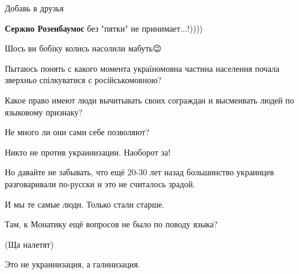 \begin{itemize}
 
Добавь в друзья

 
\textbf{Сержио Розенбаумос} без "пятки" не принимает...!))))

 
Шось ви бобіку колись насолили мабуть😉🤘🤘🤘


Пытаюсь понять с какого момента україномовна частина населення почала зверхньо
спілкуватися с російськомовною?

Какое право имеют люди вычитывать своих сограждан и высмеивать людей по
языковому признаку?

Не много ли они сами себе позволяют?

Никто не против украинизации. Наоборот за!

Но давайте не забывать, что ещё 20-30 лет назад большинство украинцев
разговаривали по-русски и это не считалось зрадой.

И мы те самые люди. Только стали старше.

Там, к Монатику ещё вопросов не было по поводу языка?

(Ща налетят)

\begin{itemize}
 
Это не украинизация, а галинизация.

 

\end{itemize}
\end{itemize}
